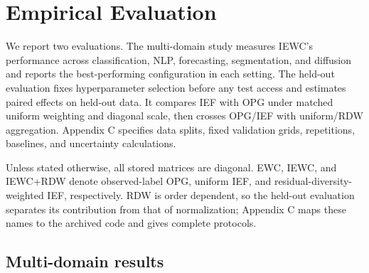 \section{Empirical Evaluation}
\label{sec:empirical}

We report two evaluations. The multi-domain study measures IEWC's performance across classification, NLP, forecasting, segmentation, and diffusion and reports the best-performing configuration in each setting. The held-out evaluation fixes hyperparameter selection before any test access and estimates paired effects on held-out data. It compares IEF with OPG under matched uniform weighting and diagonal scale, then crosses OPG/IEF with uniform/RDW aggregation. Appendix C specifies data splits, fixed validation grids, repetitions, baselines, and uncertainty calculations.

Unless stated otherwise, all stored matrices are diagonal. EWC, IEWC, and IEWC+RDW denote observed-label OPG, uniform IEF, and residual-diversity-weighted IEF, respectively. RDW is order dependent, so the held-out evaluation separates its contribution from that of normalization; Appendix C maps these names to the archived code and gives complete protocols.

\subsection{Multi-domain results}

